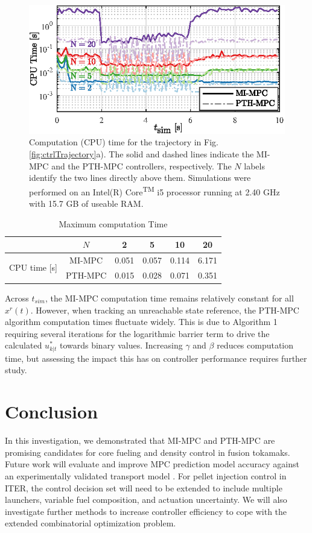 \documentclass[journal,twoside,web]{ieeecolor}
\begin{document}
\begin{figure}[t!]
\centering
\parbox{\columnwidth}{\includegraphics[width=\columnwidth]{orric4.eps}}
\caption{Computation (CPU) time for the trajectory in Fig. \ref{fig:ctrlTrajectory}a). The solid and dashed lines indicate the MI-MPC and the PTH-MPC controllers, respectively. The $N$ labels identify the two lines directly above them. Simulations were performed on an Intel(R) Core\textsuperscript{TM} i5 processor running at 2.40 GHz with 15.7 GB of useable RAM.}
\label{fig:compTime}
\end{figure}

\begin{table}[t!]
\caption{Maximum computation Time}
\centering
\begin{tabular}{cccccc}
\toprule
 & $N$ & 2 & 5 & 10 & 20 \\
\midrule
\multirow{2}{*}{CPU time [s]} & MI-MPC  & 0.051 & 0.057 & 0.114 & 6.171 \\
& PTH-MPC & 0.015 & 0.028 & 0.071 & 0.351 \\ 
\bottomrule 
\end{tabular}
\label{tab:compTime}
\end{table}



Across $t_{sim}$, the MI-MPC computation time remains relatively constant for all $x^r(t)$. However, when tracking an unreachable state reference, the PTH-MPC algorithm computation times fluctuate widely. This is due to Algorithm 1 requiring several iterations for the logarithmic barrier term to drive the calculated $u^*_{k|t}$ towards binary values. Increasing  $\gamma$ and $\beta$ reduces computation time, but assessing the impact this has on controller performance requires further study.

\section{Conclusion}
\label{sec:conclusion}
In this investigation, we demonstrated that MI-MPC and PTH-MPC are promising candidates for core fueling and density control in fusion tokamaks. Future work will evaluate and improve MPC prediction model accuracy against an experimentally validated transport model \cite{Blanken2018, Bosman2021}. For pellet injection control in ITER, the control decision set will need to be extended to include multiple launchers, variable fuel composition, and actuation uncertainty. We will also investigate further methods to increase controller efficiency to cope with the extended combinatorial optimization problem. 


% 

\end{document}
